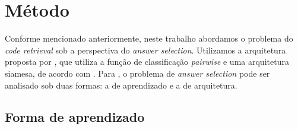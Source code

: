 \documentclass[12pt]{article}
\begin{document}







\section{Método} \label{sec:metodo}

Conforme mencionado anteriormente, neste trabalho abordamos o problema do \textit{code retrieval} sob a perspectiva do \textit{answer selection}. Utilizamos 
a arquitetura proposta por \cite{tan-lstm-qa}, que utiliza a função de classificação \textit{pairwise} e uma arquitetura siamesa, de acordo com \cite{lai-etal-2018-review}. Para 
\cite{lai-etal-2018-review}, o problema de \textit{answer selection} pode ser analisado sob duas formas: a de aprendizado e a de arquitetura.

\subsection{Forma de aprendizado}
\end{document}
